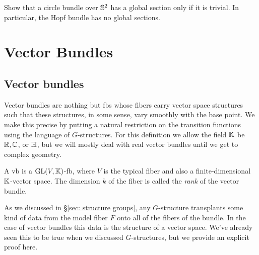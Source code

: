\begin{xca}
    Show that a circle bundle over $\mathbb{S}^2$ has a global section only if it is trivial. In particular, the Hopf bundle has no global sections.
\end{xca}





\clearpage
\chapter{Vector Bundles}


\section{Vector bundles}

Vector bundles are nothing but \glspl{fb} whose fibers carry vector space structures such that these structures, in some sense, vary smoothly with the base point. We make this precise by putting a natural restriction on the transition functions using the language of $G$-structures. For this definition we allow the field $\mathbb{K}$ be $\mathbb{R},\mathbb{C}$, or $\mathbb{H}$, but we will mostly deal with real vector bundles until we get to complex geometry.

\begin{defn}
    A \gls{vb} is a $\operatorname{GL}(V,\mathbb{K})$-\gls{fb}, where $V$ is the typical fiber and also a finite-dimensional $\mathbb{K}$-vector space. The dimension $k$ of the fiber is called the \emph{rank} of the vector bundle.
\end{defn}

As we discussed in \S\ref{sec: structure groups}, any $G$-structure transplants some kind of data from the model fiber $F$ onto all of the fibers of the bundle. In the case of vector bundles this data is the structure of a vector space. We've already seen this to be true when we discussed $G$-structures, but we provide an explicit proof here.

